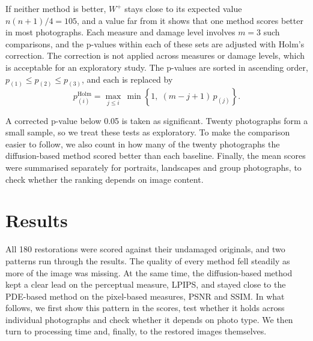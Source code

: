 \documentclass[conference]{IEEEtran}
\begin{document}
If neither method is better, $W^{+}$ stays close to its expected value $n(n + 1)/4 = 105$, and a value far from it shows that one method scores better in most photographs. Each measure and damage level involves $m = 3$ such comparisons, and the p-values within each of these sets are adjusted with Holm's correction. The correction is not applied across measures or damage levels, which is acceptable for an exploratory study. The p-values are sorted in ascending order, $p_{(1)} \le p_{(2)} \le p_{(3)}$, and each is replaced by
\begin{equation}
  p^{\mathrm{Holm}}_{(i)} = \max_{j \le i} \, \min\left\{1,\; (m - j + 1)\, p_{(j)}\right\}.
  \label{eq:holm}
\end{equation}

A corrected p-value below 0.05 is taken as significant. Twenty photographs form a small sample, so we treat these tests as exploratory. To make the comparison easier to follow, we also count in how many of the twenty photographs the diffusion-based method scored better than each baseline. Finally, the mean scores were summarised separately for portraits, landscapes and group photographs, to check whether the ranking depends on image content.

\section{Results}
\label{sec:results}

All 180 restorations were scored against their undamaged originals, and two patterns run through the results. The quality of every method fell steadily as more of the image was missing. At the same time, the diffusion-based method kept a clear lead on the perceptual measure, LPIPS, and stayed close to the PDE-based method on the pixel-based measures, PSNR and SSIM. In what follows, we first show this pattern in the scores, test whether it holds across individual photographs and check whether it depends on photo type. We then turn to processing time and, finally, to the restored images themselves.
\end{document}

